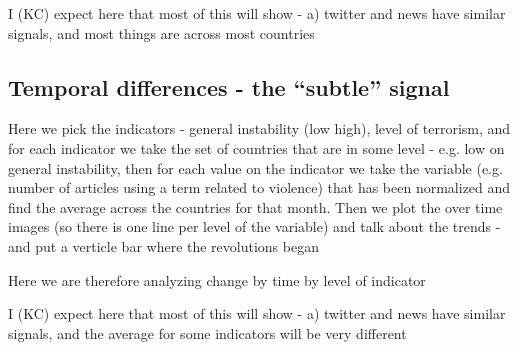 I (KC) expect here that most of this will show - a) twitter and news have similar signals, and most things are across most countries 

\subsection{Temporal differences - the ``subtle'' signal}
 
Here we pick the indicators - general instability (low high), level of
terrorism, and for each indicator we take the set of countries that are
in some level - e.g. low on general instability, then for each value on
the indicator we take the variable (e.g. number of articles using a term related to violence) that has been normalized and find the average across the countries for that month.  Then we plot the over time images (so there is one line per level of the variable) and talk about the trends - and put a verticle bar where the revolutions began

Here we are therefore analyzing change by time by level of indicator 

I (KC) expect here that most of this will show - a) twitter and news have similar signals, and the average for some indicators will be very different

